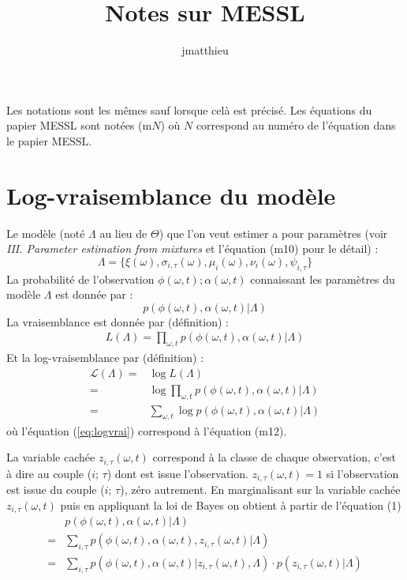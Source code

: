 \documentclass[a4paper,12pt]{article}
\title{Notes sur MESSL}
\author{jmatthieu}
\begin{document}
\maketitle
Les notations sont les mêmes sauf lorsque celà est précisé. Les équations du papier MESSL sont notées (m$N$) où $N$ correspond au numéro de l'équation dans le papier MESSL.

\section{Log-vraisemblance du modèle}

Le modèle (noté $\Lambda$ au lieu de $\Theta$) que l'on veut estimer a pour paramètres (voir \textit{III. Parameter estimation from mixtures} et l'équation (m10) pour le détail) :
\begin{equation*}
\Lambda = \{\xi(\omega),\sigma_{i,\tau}(\omega),\mu_{i}(\omega),\nu_i(\omega),\psi_{i,\tau}\}
\end{equation*}
La probabilité de l'observation $\phi(\omega,t) ; \alpha(\omega,t)$ connaissant les paramètres du modèle $\Lambda$ est donnée par :
\begin{equation*}
p(\phi(\omega,t), \alpha(\omega,t) | \Lambda)
\end{equation*}
La vraisemblance est donnée par (définition) :
\begin{align*}
L(\Lambda) = \displaystyle \prod_{\omega,t} p(\phi(\omega,t), \alpha(\omega,t) | \Lambda)
\end{align*}
Et la log-vraisemblance par (définition) :
\begin{align}
\mathcal{L}(\Lambda) = & \log L(\Lambda) \nonumber \\
 = & \log \displaystyle \prod_{\omega,t} p(\phi(\omega,t), \alpha(\omega,t) | \Lambda) \nonumber \\
 = & \displaystyle\sum_{\omega,t} \log p(\phi(\omega,t), \alpha(\omega,t) | \Lambda) \label{eq:logvrai}
\end{align}
où l'équation (\ref{eq:logvrai}) correspond à l'équation (m12).

La variable cachée $z_{i,\tau}(\omega,t)$ correspond à la classe de chaque observation, c'est à dire au couple ($i$; $\tau$) dont est issue l'observation. $z_{i,\tau}(\omega,t) = 1$ si l'observation est issue du couple ($i$; $\tau$), zéro autrement. En marginalisant sur la variable cachée $z_{i,\tau}(\omega,t)$ puis en appliquant la loi de Bayes on obtient à partir de l'équation (1)
\begin{align}
& p(\phi(\omega,t), \alpha(\omega,t) | \Lambda)\nonumber \\
= & \displaystyle\sum_{i, \tau} p(\phi(\omega,t), \alpha(\omega,t), z_{i, \tau}(\omega,t) | \Lambda) \nonumber\\
= & \displaystyle\sum_{i, \tau} p(\phi(\omega,t), \alpha(\omega,t) | z_{i, \tau}(\omega,t), \Lambda) \cdot p(z_{i, \tau}(\omega,t) | \Lambda) \label{eq:margi}
\end{align}
\end{document}
